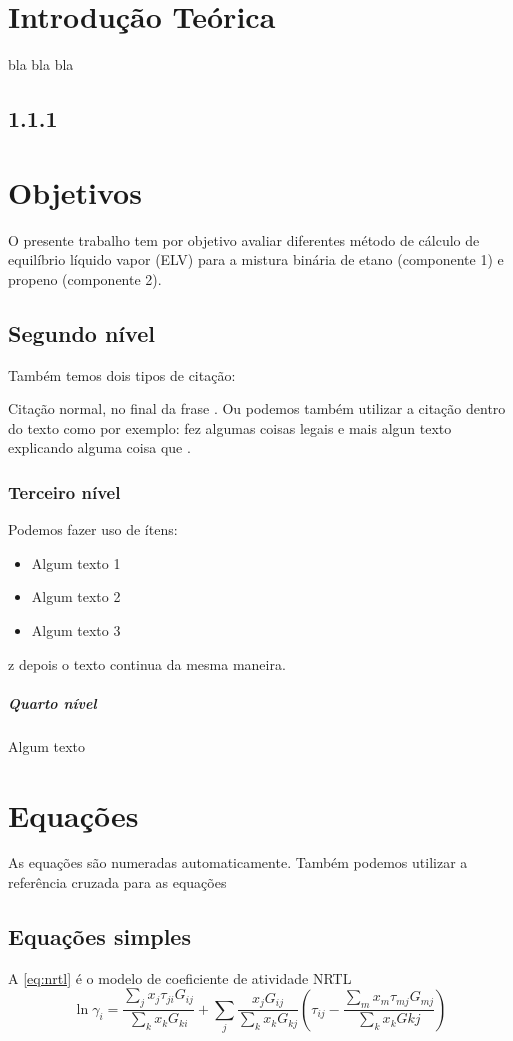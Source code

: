 \section{Introdução Teórica}
bla bla bla
\subsection{1.1.1}
\section {Objetivos}
O presente trabalho tem por objetivo avaliar diferentes método de cálculo de
equilíbrio líquido vapor (ELV) para a mistura binária de etano (componente 1)
e propeno (componente 2).

\subsection{Segundo nível}
Também temos dois tipos de citação:

Citação normal, no final da frase \cite{Flores2016,Soares2013}. Ou podemos
também utilizar a citação dentro do texto como por exemplo:
 fez algumas coisas legais e mais algun texto explicando
alguma coisa que .



\subsubsection{Terceiro nível}
Podemos fazer uso de ítens:
\begin{itemize}
  \item Algum texto 1
  \item Algum texto 2
  \item Algum texto 3
\end{itemize}z
depois o texto continua da mesma maneira.

\subparagraph{Quarto nível}
Algum texto

\section {Equações}
As equações são numeradas automaticamente. Também podemos utilizar a referência
cruzada para as equações

\subsection{Equações simples}
A \autoref{eq:nrtl} é o modelo de coeficiente de atividade NRTL
\begin{equation}\label{eq:nrtl}
\ln \gamma_i = \frac{\displaystyle\sum_j x_j \tau_{ji}
G_{ij}}{\displaystyle\sum_k x_k G_{ki}} + \displaystyle\sum_j \frac{x_j G_{ij}}{\displaystyle\sum_k x_k G_{kj}}\left(
\tau_{ij} - \frac{\displaystyle\sum_m x_m \tau_{mj} G_{mj}}{\displaystyle\sum_k x_k G{kj}} \right)
\end{equation}

